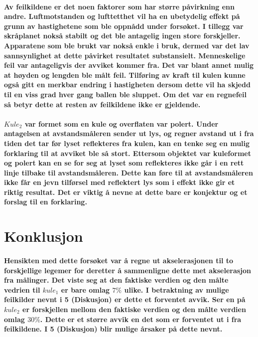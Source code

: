 \documentclass[12pt]{article}
\begin{document}
\paragraph{Av feilkildene er det noen faktorer som har større påvirkning enn andre. Luftmotstanden og lufttetthet vil ha en ubetydelig effekt på grunn av hastighetene som ble oppnådd under forsøket. I tillegg var skråplanet nokså stabilt og det ble antagelig ingen store forskjeller. Apparatene som ble brukt var nokså enkle i bruk, dermed var det lav sannsynlighet at dette påvirket resultatet substansielt. Menneskelige feil var antageligvis der avviket kommer fra. Det var blant annet mulig at høyden og lengden ble målt feil. Tilføring av kraft til kulen kunne også gitt en merkbar endring i hastigheten dersom dette vil ha skjedd til en viss grad hver gang ballen ble sluppet. Om det var en regnefeil så betyr dette at resten av feilkildene ikke er gjeldende.}
\paragraph{
$Kule_2$ var formet som en kule og overflaten var polert. Under antagelsen at avstandsmåleren sender ut lys, og regner avstand ut i fra tiden det tar før lyset reflekteres fra kulen, kan en tenke seg en mulig forklaring til at avviket ble så stort. Ettersom objektet var kuleformet og polert kan en se for seg at lyset som reflekteres ikke går i en rett linje tilbake til avstandsmåleren. Dette kan føre til at avstandsmåleren ikke får en jevn tilførsel med reflektert lys som i effekt ikke gir et riktig resultat. Det er viktig å nevne at dette bare er konjektur og et forslag til en forklaring.}


\section{Konklusjon}

\paragraph{
    Hensikten med dette forsøket var å regne ut akselerasjonen til to forskjellige legemer for deretter å sammenligne dette met akselerasjon fra målinger. Det viste seg at den faktiske verdien og den målte vedrien til $kule_1$ er bare omlag $7\%$ ulike. I betraktning av mulige feilkilder nevnt i 5 (Diskusjon) er dette et forventet avvik. Ser en på $kule_2$ er forskjellen mellom den faktiske verdien og den målte verdien omlag $30\%$. Dette er et større avvik en det som er forventet ut i fra feilkildene. I 5 (Diskusjon) blir mulige årsaker på dette nevnt.}
    
\end{document}
